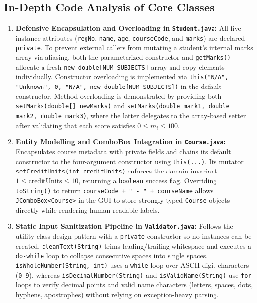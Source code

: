\documentclass[10pt,a4paper]{article}
\begin{document}
\subsection{In-Depth Code Analysis of Core Classes}
\begin{enumerate}[leftmargin=0.4cm, itemsep=0.5pt, topsep=0.5pt]
    \item \textbf{Defensive Encapsulation and Overloading in \texttt{Student.java}:} All five instance attributes (\texttt{regNo}, \texttt{name}, \texttt{age}, \texttt{courseCode}, and \texttt{marks}) are declared \texttt{private}. To prevent external callers from mutating a student's internal marks array via aliasing, both the parameterized constructor and \texttt{getMarks()} allocate a fresh \texttt{new double[NUM\_SUBJECTS]} array and copy elements individually. Constructor overloading is implemented via \texttt{this("N/A", "Unknown", 0, "N/A", new double[NUM\_SUBJECTS])} in the default constructor. Method overloading is demonstrated by providing both \texttt{setMarks(double[] newMarks)} and \texttt{setMarks(double mark1, double mark2, double mark3)}, where the latter delegates to the array-based setter after validating that each score satisfies $0 \le m_i \le 100$.
    \item \textbf{Entity Modelling and ComboBox Integration in \texttt{Course.java}:} Encapsulates course metadata with private fields and chains its default constructor to the four-argument constructor using \texttt{this(...)}. Its mutator \texttt{setCreditUnits(int creditUnits)} enforces the domain invariant $1 \le \text{creditUnits} \le 10$, returning a \texttt{boolean} success flag. Overriding \texttt{toString()} to return \texttt{courseCode + " - " + courseName} allows \texttt{JComboBox<Course>} in the GUI to store strongly typed \texttt{Course} objects directly while rendering human-readable labels.
    \item \textbf{Static Input Sanitization Pipeline in \texttt{Validator.java}:} Follows the utility-class design pattern with a \texttt{private} constructor so no instances can be created. \texttt{cleanText(String)} trims leading/trailing whitespace and executes a \texttt{do-while} loop to collapse consecutive spaces into single spaces. \texttt{isWholeNumber(String, int)} uses a \texttt{while} loop over ASCII digit characters (\texttt{0}--\texttt{9}), whereas \texttt{isDecimalNumber(String)} and \texttt{isValidName(String)} use \texttt{for} loops to verify decimal points and valid name characters (letters, spaces, dots, hyphens, apostrophes) without relying on exception-heavy parsing.

\end{enumerate}
\end{document}
